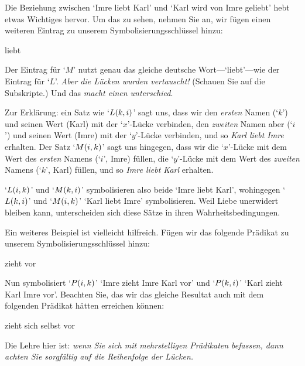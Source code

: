 Die Beziehung zwischen `Imre liebt Karl' und `Karl wird von Imre geliebt' hebt etwas Wichtiges hervor. Um das zu sehen, nehmen Sie an, wir fügen einen weiteren Eintrag zu unserem Symbolisierungsschlüssel hinzu:
\begin{ekey}
	\item[\atom{M}{x,y}]  liebt 
\end{ekey}
Der Eintrag für `$M$' nutzt genau das gleiche deutsche Wort---`liebt'---wie der Eintrag für `$L$'. \emph{Aber die Lücken wurden vertauscht!} (Schauen Sie auf die Subskripte.) Und das \emph{macht einen unterschied}.

Zur Erklärung: ein Satz wie `$\mathord{L}(k,i)$' sagt uns, dass wir den \emph{ersten} Namen (`$k$') und seinen Wert (Karl) mit der `$x$'-Lücke verbinden, den \emph{zweiten} Namen aber (`$i$') und seinen Wert (Imre) mit der `$y$'-Lücke verbinden, und so \emph{Karl liebt Imre} erhalten. Der Satz `$\mathord{M}(i,k)$' sagt uns hingegen, dass wir die `$x$'-Lücke mit dem Wert des \emph{ersten} Namens (`$i$', Imre) füllen, die `$y$'-Lücke mit dem Wert des \emph{zweiten} Namens (`$k$', Karl) füllen, und so \emph{Imre liebt Karl} erhalten. 

`$\mathord{L}(i,k)$' und `$\mathord{M}(k,i)$' symbolisieren also beide `Imre liebt Karl', wohingegen `$\mathord{L}(k,i)$' und `$\mathord{M}(i,k)$' `Karl liebt Imre' symbolisieren. Weil Liebe unerwidert bleiben kann, unterscheiden sich diese Sätze in ihren Wahrheitsbedingungen. 

Ein weiteres Beispiel ist vielleicht hilfreich. Fügen wir das folgende Prädikat zu unserem Symbolisierungsschlüssel hinzu:
\begin{ekey}
	\item[\atom{P}{x,y}]  zieht   vor
\end{ekey}
Nun symbolisiert `$\mathord{P}(i,k)$' `Imre zieht Imre Karl vor' und `$\mathord{P}(k,i)$' `Karl zieht Karl Imre vor'. Beachten Sie, das wir das gleiche Resultat auch mit dem folgenden Prädikat hätten erreichen können:
\begin{ekey}
	\item[\atom{P}{x,y}]  zieht sich selbst  vor
\end{ekey}
Die Lehre hier ist: \emph{wenn Sie sich mit mehrstelligen Prädikaten befassen, dann achten Sie sorgfältig auf die Reihenfolge der Lücken.} 


